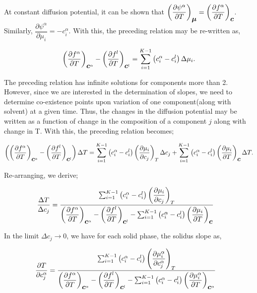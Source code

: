 \documentclass[a4paper,10pt]{article}
\newcommand{\vc}{\mbox{\boldmath{$c$}}}
\newcommand{\vmu}{\mbox{\boldmath{$\mu$}}}
\begin{document}
\begin{itemize}
 At constant diffusion potential, it can be shown that $\left(\dfrac{\partial \psi^{\alpha}}{\partial T}\right)_{\vmu} = \left(\dfrac{\partial f^{\alpha}}{\partial T}\right)_{\vc}$.
 Similarly, $\dfrac{\partial \psi^{\alpha}}{\partial \mu_i} = -c_i^{\alpha}$. With this, the preceding relation may be re-written as,
 
 \begin{align*}
  \left(\dfrac{\partial f^{\alpha}}{\partial T}\right)_{\vc^{\alpha}} - \left(\dfrac{\partial f^l}{\partial T}\right)_{\vc^{l}} = \sum_{i=1}^{K-1} \left(c_i^{\alpha} - c_i^{l}\right)\Delta \mu_i.
 \end{align*}
 
 The preceding relation has infinite solutions for components more than 2. However, since we are interested in the determination of slopes, we need to determine co-existence points 
 upon variation of one component(along with solvent) at a given time. Thus, the changes in the diffusion potential may be written as a function of change in the composition of a
 component $j$ along with change in T. With this, the preceding relation becomes;
 
 \begin{align*}
  \left(\left(\dfrac{\partial f^{\alpha}}{\partial T}\right)_{\vc^{\alpha}} - \left(\dfrac{\partial f^l}{\partial T}\right)_{\vc^{l}}\right)\Delta T = 
  \sum_{i=1}^{K-1} \left(c_i^{\alpha} - c_i^{l}\right)\left(\dfrac{\partial \mu_i}{\partial c_j}\right)_T\Delta c_j + \sum_{i=1}^{K-1}\left(c_i^{\alpha} - c_i^{l}\right)\left(\dfrac{\partial \mu_i}{\partial T}\right)_{\vc} \Delta T.
 \end{align*}
 
 Re-arranging, we derive;
 
 \begin{align*}
  \dfrac{\Delta T}{\Delta c_j} &=  \dfrac{\sum_{i=1}^{K-1} \left(c_i^{\alpha} - c_i^{l}\right)\left(\dfrac{\partial \mu_i}{\partial c_j}\right)_T}{\left(\dfrac{\partial f^{\alpha}}{\partial T}\right)_{\vc^{\alpha}} 
  - \left(\dfrac{\partial f^l}{\partial T}\right)_{\vc^{l}} -  \sum_{i=1}^{K-1}\left(c_i^{\alpha} - c_i^{l}\right)\left(\dfrac{\partial \mu_i}{\partial T}\right)_{\vc}}
 \end{align*}
 
 In the limit $\Delta c_j \rightarrow 0$, we have for each solid phase, the solidus slope as, 
 
 \begin{align*}
  \dfrac{\partial T}{\partial c_j^{\alpha}} &=  \dfrac{\sum_{i=1}^{K-1} \left(c_i^{\alpha} - c_i^{l}\right)\left(\dfrac{\partial \mu_i^{\alpha}}{\partial c_j^{\alpha}}\right)_T}{\left(\dfrac{\partial f^{\alpha}}{\partial T}\right)_{\vc^{\alpha}} 
  - \left(\dfrac{\partial f^l}{\partial T}\right)_{\vc^{l}} -  \sum_{i=1}^{K-1}\left(c_i^{\alpha} - c_i^{l}\right)\left(\dfrac{\partial \mu_i^{\alpha}}{\partial T}\right)_{\vc^{\alpha}}}
 \end{align*}
 

\end{itemize}
\end{document}
